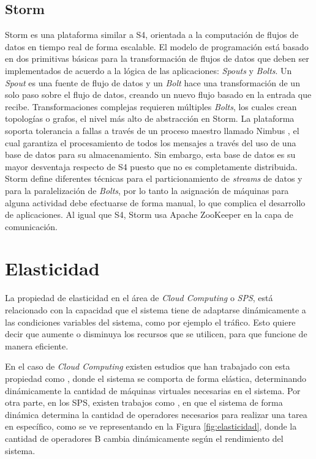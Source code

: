 \subsection{Storm}
Storm \citep{bookstorm} es una plataforma similar a S4, orientada a la computación de flujos de datos en tiempo real de forma escalable. El modelo de programación está basado en dos primitivas básicas para la transformación de flujos de datos que deben ser implementados de acuerdo a la lógica de las aplicaciones: \textit{Spouts} y \textit{Bolts}. Un \textit{Spout} es una fuente de flujo de datos y un \textit{Bolt} hace una transformación de un solo paso sobre el flujo de datos, creando un nuevo flujo basado en la entrada que recibe. Transformaciones complejas requieren múltiples \textit{Bolts}, los cuales crean topologías o grafos, el nivel más alto de abstracción en Storm. La plataforma soporta tolerancia a fallas a través de un proceso maestro llamado Nimbus \citep{MiaoYJ14}, el cual garantiza el procesamiento de todos los mensajes a través del uso de una base de datos para su almacenamiento. Sin embargo, esta base de datos es su mayor desventaja respecto de S4 puesto que no es completamente distribuida. Storm define diferentes técnicas para el particionamiento de \textit{streams} de datos y para la paralelización de \textit{Bolts}, por lo tanto la asignación de máquinas para alguna actividad debe efectuarse de forma manual, lo que complica el desarrollo de aplicaciones. Al igual que S4, Storm usa Apache ZooKeeper \citep{HuntKJR10} en la capa de comunicación.

\section{Elasticidad}
\label{sec:elasticidad}

La propiedad de elasticidad en el área de \textit{Cloud Computing} o \textit{SPS}, está relacionado con la capacidad que el sistema tiene de adaptarse dinámicamente a las condiciones variables del sistema, como por ejemplo el tráfico. Esto quiere decir que aumente o disminuya los recursos que se utilicen, para que funcione de manera eficiente.

En el caso de \textit{Cloud Computing} existen estudios que han trabajado con esta propiedad como \citep{GongGW10, NguyenSGSW13, LehrigEB15}, donde el sistema se comporta de forma elástica, determinando dinámicamente la cantidad de máquinas virtuales necesarias en el sistema. Por otra parte, en los SPS, existen trabajos como \citep{GedikSHW14, IshiiS11, SchneiderAGBW09, MadsenTZ14, GulisanoJPSV12}, en que el sistema de forma dinámica determina la cantidad de operadores necesarios para realizar una tarea en específico, como se ve representando en la Figura \ref{fig:elasticidad}, donde la cantidad de operadores B cambia dinámicamente según el rendimiento del sistema.

